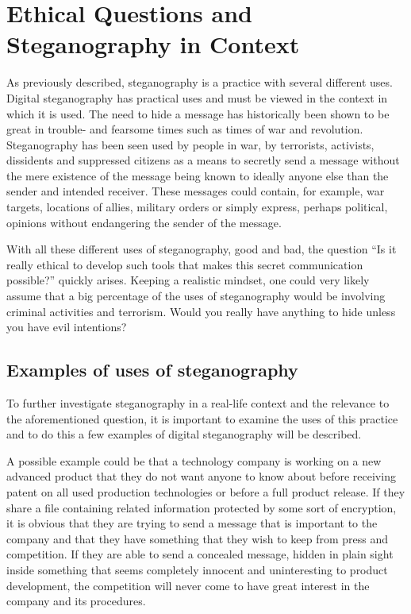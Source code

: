 \section{Ethical Questions and Steganography in Context}
As previously described, steganography is a practice with several different uses.
Digital steganography has practical uses and must be viewed in the context in which it is used.
The need to hide a message has historically been shown to be great in trouble- and fearsome times such as times of war and revolution.
Steganography has been seen used by people in war, by terrorists, activists, dissidents and suppressed citizens as a means to secretly send a message without the mere existence of the message being known to ideally anyone else than the sender and intended receiver.
These messages could contain, for example, war targets, locations of allies, military orders or simply express, perhaps political, opinions without endangering the sender of the message.

With all these different uses of steganography, good and bad, the question ``Is it really ethical to develop such tools that makes this secret communication possible?'' quickly arises. Keeping a realistic mindset, one could very likely assume that a big percentage of the uses of steganography would be involving criminal activities and terrorism. Would you really have anything to hide unless you have evil intentions?

\subsection{Examples of uses of steganography}
To further investigate steganography in a real-life context and the relevance to the aforementioned question, it is important to examine the uses of this practice and to do this a few examples of digital steganography will be described.

A possible example could be that a technology company is working on a new advanced product that they do not want anyone to know about before receiving patent on all used production technologies or before a full product release.
If they share a file containing related information protected by some sort of encryption, it is obvious that they are trying to send a message that is important to the company and that they have something that they wish to keep from press and competition.
If they are able to send a concealed message, hidden in plain sight inside something that seems completely innocent and uninteresting to product development, the competition will never come to have great interest in the company and its procedures.


